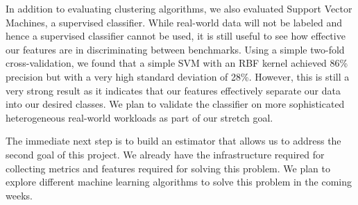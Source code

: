 In addition to evaluating clustering algorithms, we also evaluated
Support Vector Machines, a supervised classifier. While real-world
data will not be labeled and hence a supervised classifier cannot be
used, it is still useful to see how effective our features are in
discriminating between benchmarks. Using a simple two-fold
cross-validation, we found that a simple SVM with an RBF kernel
achieved 86\% precision but with a very high standard deviation of
28\%. However, this is still a very strong result as it indicates that
our features effectively separate our data into our desired
classes. 
We plan to validate the classifier on more sophisticated heterogeneous 
real-world workloads as part of our stretch goal.

The immediate next step is to build an estimator that allows us to address the
second goal of this project. We already have the infrastructure required
for collecting metrics and features required for solving this problem.
We plan to explore different machine learning algorithms to solve this
problem in the coming weeks.
 


